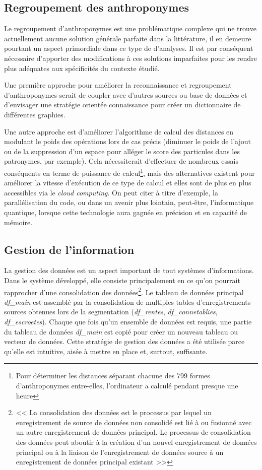 \subsection{Regroupement des anthroponymes}
Le regroupement d'anthroponymes est une problématique complexe qui ne trouve actuellement aucune solution générale parfaite dans la littérature, il en demeure   pourtant un aspect primordiale dans ce type de d'analyses. Il est par conséquent nécessaire d'apporter des modifications à ces solutions imparfaites pour les rendre plus adéquates aux spécificités du contexte étudié.

Une première approche pour améliorer la reconnaissance et regroupement d'anthroponymes serait de coupler avec d'autres sources ou base de données et d'envisager une stratégie orientée connaissance pour créer un  dictionnaire de différentes graphies.

Une autre approche est d'améliorer l'algorithme de calcul des distances en modulant le poids des opérations lors de cas précis (diminuer le poids de l'ajout ou de la suppression d'un espace pour alléger le score des particules dans les patronymes, par exemple). Cela nécessiterait d'effectuer de nombreux essais conséquents en terme de puissance de calcul\footnote{Pour déterminer les distances séparant chacune des 799 formes d'anthroponymes entre-elles, l'ordinateur a calculé pendant presque une heure}, mais des alternatives existent pour améliorer la vitesse d'exécution de ce type de calcul et elles sont de plus en plus accessibles via le \textit{cloud computing}. On peut citer à titre d'exemple, la parallélisation du code, ou dans un avenir plus lointain, peut-être, l'informatique quantique, lorsque cette technologie aura gagnée en précision et en capacité de mémoire.

\subsection{Gestion de l'information}
La gestion des données est un aspect important de tout systèmes d'informations.
Dans le système développé, elle consiste principalement en ce qu'on pourrait rapprocher d'une consolidation des données\footnote{<< La consolidation des données est le processus par lequel un enregistrement de source de données non consolidé est lié à ou fusionné avec un autre enregistrement de données principal. Le processus de consolidation des données peut aboutir à la création d'un nouvel enregistrement de données principal ou à la liaison de l'enregistrement de données source à un enregistrement de données principal existant >> }. Le tableau de données principal \textit{df\_main} est assemblé par la consolidation de multiples tables d'enregistrements sources obtenues lors de la segmentation (\textit{df\_rentes}, \textit{df\_connetablies}, \textit{df\_escroetes}). Chaque que fois qu'un ensemble de données est requis, une partie du tableau de données \textit{df\_main} est copié pour créer un nouveau tableau ou vecteur de données. Cette stratégie de gestion des données  a été utilisée parce qu'elle est intuitive, aisée à mettre en place et, surtout, suffisante.

